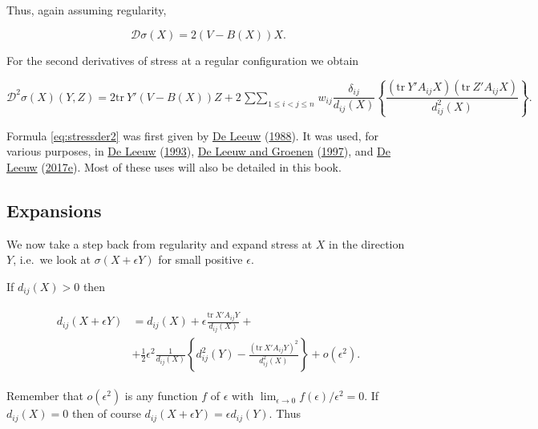 \documentclass[
  12pt,
]{book}
\theoremstyle{definition}
\theoremstyle{definition}
\theoremstyle{definition}
\theoremstyle{definition}
\theoremstyle{remark}
\begin{document}
Thus, again assuming regularity,

\begin{equation}
\mathcal{D}\sigma(X)=2(V-B(X))X.
\label{eq:stressder1}
\end{equation}

For the second derivatives of stress at a regular configuration we obtain

\begin{equation}
\mathcal{D}^2\sigma(X)(Y,Z)=2\text{tr}\ Y'(V-B(X))Z+2\mathop{\sum\sum}_{1\leq i<j\leq n}w_{ij}\frac{\delta_{ij}}{d_{ij}(X)}\left\{\frac{(\text{tr}\ Y'A_{ij}X)(\text{tr}\ Z'A_{ij}X)}{d_{ij}^2(X)}\right\}.
\label{eq:stressder2}
\end{equation}

Formula \eqref{eq:stressder2} was first given by \protect\hyperlink{ref-deleeuw_A_88b}{De Leeuw} (\protect\hyperlink{ref-deleeuw_A_88b}{1988}). It was used, for various purposes, in \protect\hyperlink{ref-deleeuw_R_93c}{De Leeuw} (\protect\hyperlink{ref-deleeuw_R_93c}{1993}), \protect\hyperlink{ref-deleeuw_groenen_A_97}{De Leeuw and Groenen} (\protect\hyperlink{ref-deleeuw_groenen_A_97}{1997}), and \protect\hyperlink{ref-deleeuw_E_17q}{De Leeuw} (\protect\hyperlink{ref-deleeuw_E_17q}{2017e}). Most of these uses will also be detailed in this book.

\hypertarget{expansions}{%
\subsection{Expansions}\label{expansions}}

We now take a step back from regularity and expand stress at \(X\) in the direction \(Y\), i.e.~we look at \(\sigma(X+\epsilon Y)\) for small positive \(\epsilon\).

If \(d_{ij}(X)>0\) then

\begin{align}
\begin{split}
d_{ij}(X+\epsilon Y)&=d_{ij}(X)+\epsilon\frac{\text{tr}\ X'A_{ij}Y}{d_{ij}(X)}+\\
&+\frac12\epsilon^2\frac{1}{d_{ij}(X)}\left\{d_{ij}^2(Y)-\frac{(\text{tr}\ X'A_{ij}Y)^2}{d_{ij}^2(X)}\right\}+o(\epsilon^2).
\end{split}
\label{eq:propexpd}
\end{align}

Remember that \(o(\epsilon^2)\) is any function \(f\) of \(\epsilon\) with
\(\lim_{\epsilon\rightarrow 0}f(\epsilon)/\epsilon^2=0\).
If \(d_{ij}(X)=0\) then of course \(d_{ij}(X+\epsilon Y)=\epsilon d_{ij}(Y)\). Thus
\end{document}
